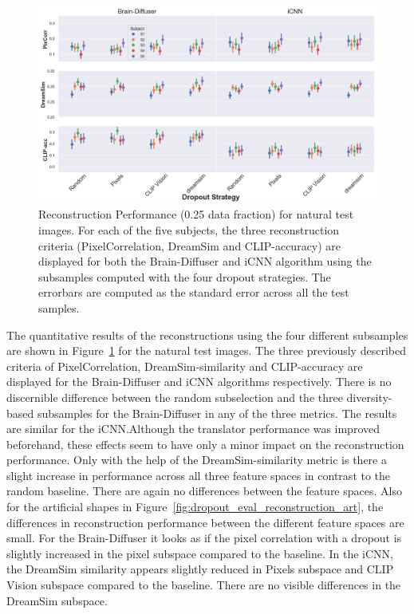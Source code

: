 \begin{figure}[ht]
  \centering
  \includegraphics[width=1\textwidth]{plots/dropout_eval_reconstruction_test.png}
  \caption[Experiment 1: Reconstruction performance for natural test images]{Reconstruction Performance (0.25 data fraction) for natural test images. For each of the five subjects, the three reconstruction criteria (PixelCorrelation, DreamSim and CLIP-accuracy) are displayed for both the Brain-Diffuser and iCNN algorithm using the subsamples computed with the four dropout strategies. The errorbars are computed as the standard error across all the test samples.}\label{fig:dropout_eval_reconstruction_test}
\end{figure}

The quantitative results of the reconstructions using the four different subsamples are shown in Figure~\ref{fig:dropout_eval_reconstruction_test} for the natural test images. The three previously described criteria of PixelCorrelation, DreamSim-similarity and CLIP-accuracy are displayed for the Brain-Diffuser and iCNN algorithms respectively. There is no discernible difference between the random subselection and the three diversity-based subsamples for the Brain-Diffuser in any of the three metrics. The results are similar for the iCNN.\@ Although the translator performance was improved beforehand, these effects seem to have only a minor impact on the reconstruction performance. Only with the help of the DreamSim-similarity metric is there a slight increase in performance across all three feature spaces in contrast to the random baseline. There are again no differences between the feature spaces. Also for the artificial shapes in Figure~\ref{fig:dropout_eval_reconstruction_art}, the differences in reconstruction performance between the different feature spaces are small. For the Brain-Diffuser it looks as if the pixel correlation with a dropout is slightly increased in the pixel subspace compared to the baseline.  In the iCNN, the DreamSim similarity appears slightly reduced in Pixels subspace and CLIP Vision subspace compared to the baseline. There are no visible differences in the DreamSim subspace.

